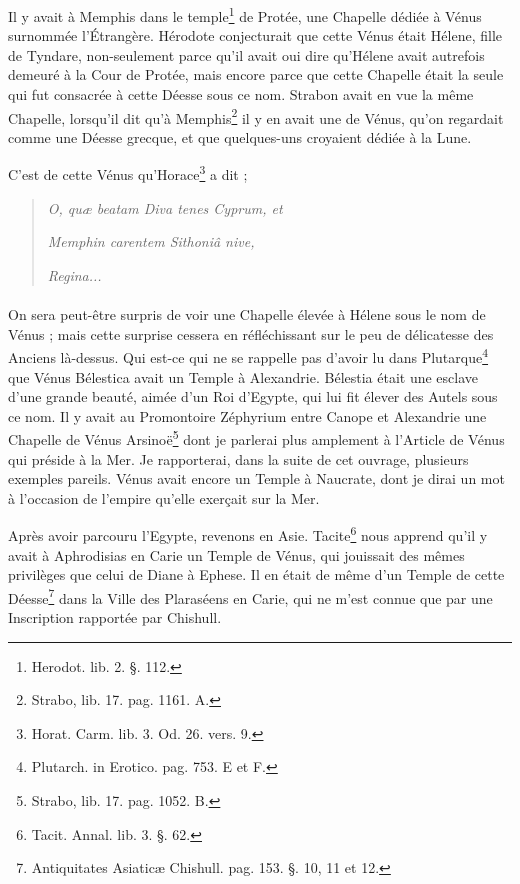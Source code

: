 \documentclass[a4paper, 11pt, oneside, polutonikogreek, french]{article}
\begin{document}
Il y avait à Memphis dans le temple\footnote{Herodot. lib. 2. §. 112.} de Protée, une Chapelle dédiée à Vénus surnommée l'Étrangère. Hérodote conjecturait que cette Vénus était Hélene, fille de Tyndare, non-seulement parce qu'il avait oui dire qu'Hélene avait autrefois demeuré à la Cour de Protée, mais encore parce que cette Chapelle était la seule qui fut consacrée à cette Déesse sous ce nom. Strabon avait en vue la même Chapelle, lorsqu'il dit qu'à Memphis\footnote{Strabo, lib. 17. pag. 1161. A.} il y en avait une de Vénus, qu'on regardait comme une Déesse grecque, et que quelques-uns croyaient dédiée à la Lune.

C'est de cette Vénus qu'Horace\footnote{Horat. Carm. lib. 3. Od. 26. vers. 9.} a dit ;
\begin{quotation}
\emph{O, quæ beatam Diva tenes Cyprum, et}

\emph{Memphin carentem Sithoniâ nive,}

\hspace*{15mm}\emph{Regina...}
\end{quotation}
\paragraph{}
On sera peut-être surpris de voir une Chapelle élevée à Hélene sous le nom de Vénus ; mais cette surprise cessera en réfléchissant sur le peu de délicatesse des Anciens là-dessus. Qui est-ce qui ne se rappelle pas d'avoir lu dans Plutarque\footnote{Plutarch. in Erotico. pag. 753. E et F.} que Vénus Bélestica avait un Temple à Alexandrie. Bélestia était une esclave d'une grande beauté, aimée d'un Roi d'Egypte, qui lui fit élever des Autels sous ce nom. Il y avait au Promontoire Zéphyrium entre Canope et Alexandrie une Chapelle de Vénus Arsinoë\footnote{Strabo, lib. 17. pag. 1052. B.} dont je parlerai plus amplement à l'Article de Vénus qui préside à la Mer. Je rapporterai, dans la suite de cet ouvrage, plusieurs exemples pareils. Vénus avait encore un Temple à Naucrate, dont je dirai un mot à l'occasion de l'empire qu'elle exerçait sur la Mer.

Après avoir parcouru l'Egypte, revenons en Asie. Tacite\footnote{Tacit. Annal. lib. 3. §. 62.} nous apprend qu'il y avait à Aphrodisias en Carie un Temple de Vénus, qui jouissait des mêmes privilèges que celui de Diane à Ephese. Il en était de même d'un Temple de cette Déesse\footnote{Antiquitates Asiaticæ Chishull. pag. 153. §. 10, 11 et 12.} dans la Ville des Plaraséens en Carie, qui ne m'est connue que par une Inscription rapportée par Chishull.
\end{document}
